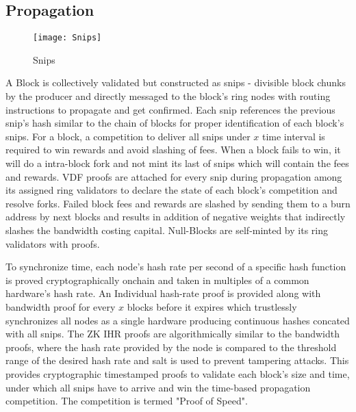 \documentclass[../Bitcoin Blink.tex]{subfiles}
\begin{document}
\subsection{Propagation}
\begin{figure}[H]
\begin{center}
\texttt{[image: Snips]}
\caption{Snips}
\end{center}
\end{figure}
A Block is collectively validated but constructed as snips - divisible block chunks by the producer and directly messaged to the block's ring nodes with routing instructions to propagate and get confirmed. Each snip references the previous snip's hash similar to the chain of blocks for proper identification of each block's snips. For a block, a competition to deliver all snips under $x$ time interval is required to win rewards and avoid slashing of fees. When a block fails to win, it will do a intra-block fork and not mint its last of snips which will contain the fees and rewards. VDF proofs are attached for every snip during propagation among its assigned ring validators to declare the state of each block's competition and resolve forks. Failed block fees and rewards are slashed by sending them to a burn address by next blocks and results in addition of negative weights that indirectly slashes the bandwidth costing capital. Null-Blocks are self-minted by its ring validators with proofs.

To synchronize time, each node's hash rate per second of a specific hash function is proved cryptographically onchain and taken in multiples of a common hardware's hash rate. An Individual hash-rate proof is provided along with bandwidth proof for every $x$ blocks before it expires which trustlessly synchronizes all nodes as a single hardware producing continuous hashes concated with all snips. The ZK IHR proofs are algorithmically similar to the bandwidth proofs, where the hash rate provided by the node is compared to the threshold range of the desired hash rate and salt is used to prevent tampering attacks.  This provides cryptographic timestamped proofs to validate each block's size and time, under which all snips have to arrive and win the time-based propagation competition. The competition is termed "Proof of Speed".
\end{document}
